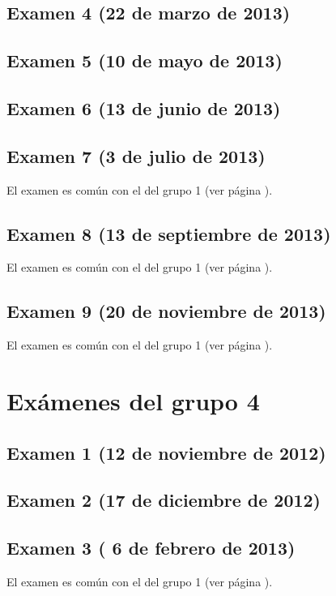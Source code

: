 \documentclass[a4paper,12pt,twoside]{book}
\begin{document}
\section{Examen 4 (22 de marzo de 2013)}
\section{Examen 5 (10 de mayo de 2013)} 
\section{Examen 6 (13 de junio de 2013)} 
\section{Examen 7 (3 de julio de 2013)} 
El examen es común con el del grupo 1 (ver página \pageref{examen_12_13_1_7}).
\section{Examen 8 (13 de septiembre de 2013)} 
El examen es común con el del grupo 1 (ver página \pageref{examen_12_13_1_8}).
\section{Examen 9 (20 de noviembre de 2013)} 
El examen es común con el del grupo 1 (ver página \pageref{examen_12_13_1_9}).

\chapter{Exámenes del grupo 4}
\section{Examen 1 (12 de noviembre de 2012)}
\section{Examen 2 (17 de diciembre de 2012)}
\section{Examen 3 ( 6 de febrero de 2013)}
El examen es común con el del grupo 1 (ver página \pageref{examen_12_13_1_3}).
\end{document}
